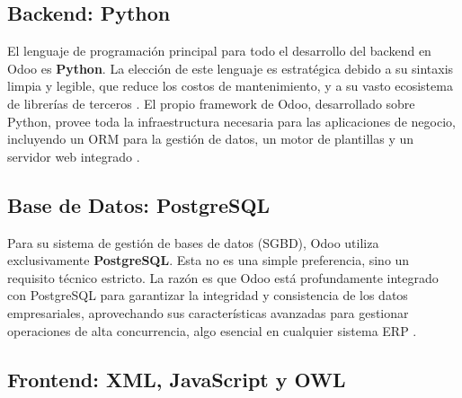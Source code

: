 \documentclass[12pt,letterpaper,spanish]{report}
\begin{document}

\subsection{Backend: Python}

El lenguaje de programación principal para todo el desarrollo del backend en Odoo es \textbf{Python}. La elección de este lenguaje es estratégica debido a su sintaxis limpia y legible, que reduce los costos de mantenimiento, y a su vasto ecosistema de librerías de terceros \cite{pythonDocs}. El propio framework de Odoo, desarrollado sobre Python, provee toda la infraestructura necesaria para las aplicaciones de negocio, incluyendo un ORM para la gestión de datos, un motor de plantillas y un servidor web integrado \cite{pretell2024mejora}.

\subsection{Base de Datos: PostgreSQL}

Para su sistema de gestión de bases de datos (SGBD), Odoo utiliza exclusivamente \textbf{PostgreSQL}. Esta no es una simple preferencia, sino un requisito técnico estricto. La razón es que Odoo está profundamente integrado con PostgreSQL para garantizar la integridad y consistencia de los datos empresariales, aprovechando sus características avanzadas para gestionar operaciones de alta concurrencia, algo esencial en cualquier sistema ERP \cite{postgresqlDocs}.

\subsection{Frontend: XML, JavaScript y OWL}
\end{document}
